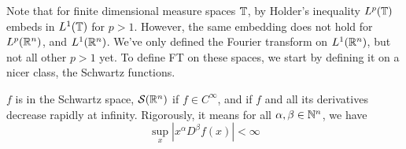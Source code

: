 Note that for finite dimensional measure spaces $\mathbb{T}$, by Holder's inequality $L^p(\mathbb{T})$ embeds in $L^1(\mathbb{T})$ for $p>1$. However, the same embedding does not hold for $L^p(\mathbb{R}^n)$, and $L^1(\mathbb{R}^n)$. We've only defined the Fourier transform on $L^1(\mathbb{R}^n)$, but not all other $p>1$ yet. To define FT on these spaces, we start by defining it on a nicer class, the Schwartz functions.

\begin{definition}
    $f$ is in the Schwartz space, $\mathcal{S}(\mathbb{R}^n)$ if $f\in C^\infty$, and if $f$ and all its derivatives decrease rapidly at infinity. Rigorously, it means for all $\alpha, \beta\in\mathbb{N}^n$, we have
    \begin{equation*}
        \sup_x|x^\alpha D^\beta f(x)|<\infty
    \end{equation*}
\end{definition}

